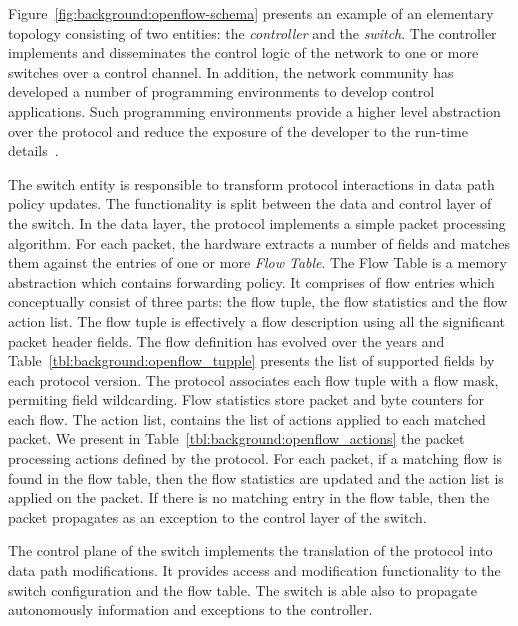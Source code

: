 Figure~\ref{fig:background:openflow-schema} presents an example of an elementary
\of topology consisting of two entities: the \emph{controller} and the
\emph{switch}. The controller implements and disseminates the control logic of
the network to one or more switches over a control channel.  In addition, the
network community has developed a number of programming environments to develop
\of control applications. Such programming environments provide a higher level
abstraction over the \of protocol and reduce the exposure of the developer to
the run-time details~\cite{nox,floodlight,nodeflow}.

The switch entity is responsible to transform \of protocol interactions in data
path policy updates. The \of functionality is split between the data and control
layer of the switch. In the data layer, the protocol implements a simple packet
processing algorithm.  For each packet, the hardware extracts a number of fields
and matches them against the entries of one or more \emph{Flow Table}.  The Flow
Table is a memory abstraction which contains forwarding policy. It comprises of
flow entries which conceptually consist of three parts: the flow tuple, the flow
statistics and the flow action list.  The flow tuple is effectively a flow
description using all the significant packet header fields.  The flow definition
has evolved over the years and Table~\ref{tbl:background:openflow_tupple}
presents the list of supported fields by each protocol version.  The protocol
associates each flow tuple with a flow mask, permiting field wildcarding.  Flow
statistics store packet and byte counters for each flow. The action list,
contains the list of actions applied to each matched packet.  We present in
Table~\ref{tbl:background:openflow_actions} the packet processing actions
defined by the \of protocol.  For each packet, if a matching flow is found in
the flow table, then the flow statistics are updated and the action list is
applied on the packet. If there is no matching entry in the flow table, then the packet
propagates as an exception to the control layer of the switch.  

The control plane of the switch implements the translation of the \of protocol
into data path modifications.  It provides access and modification functionality
to the switch configuration and the flow table. The switch is able also to
propagate autonomously information and exceptions to the controller. 

